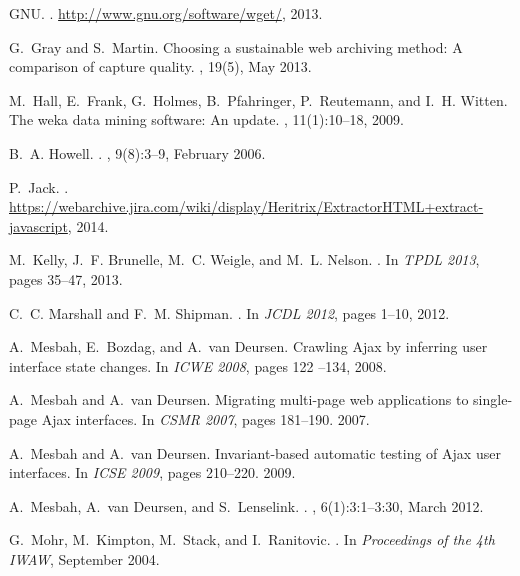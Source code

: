 \documentclass{ipres_proc_article-sp}
\begin{document}
\begin{thebibliography}{10}
{GNU}.
.
\newblock \url{http://www.gnu.org/software/wget/}, 2013.

G.~Gray and S.~Martin.
\newblock Choosing a sustainable web archiving method: A comparison of capture
  quality.
, 19(5), May 2013.

M.~Hall, E.~Frank, G.~Holmes, B.~Pfahringer, P.~Reutemann, and I.~H. Witten.
\newblock The weka data mining software: An update.
, 11(1):10--18, 2009.

B.~A. Howell.
.
, 9(8):3--9, February 2006.

P.~Jack.
.
\newblock
  \url{https://webarchive.jira.com/wiki/display/Heritrix/ExtractorHTML+extract-javascript},
  2014.

M.~Kelly, J.~F. Brunelle, M.~C. Weigle, and M.~L. Nelson.
.
\newblock In {\em {TPDL 2013}}, pages 35--47, 2013.

C.~C. Marshall and F.~M. Shipman.
.
\newblock In {\em {JCDL 2012}}, pages 1--10, 2012.

A.~Mesbah, E.~Bozdag, and A.~van Deursen.
\newblock Crawling {A}jax by inferring user interface state changes.
\newblock In {\em ICWE 2008}, pages 122 --134, 2008.

A.~Mesbah and A.~van Deursen.
\newblock Migrating multi-page web applications to single-page {Ajax} interfaces.
\newblock In {\em CSMR 2007}, pages 181--190. 2007.

A.~Mesbah and A.~van Deursen.
\newblock Invariant-based automatic testing of {A}jax user interfaces.
\newblock In {\em ICSE 2009}, pages 210--220. 2009.

A.~Mesbah, A.~van Deursen, and S.~Lenselink.
.
, 6(1):3:1--3:30, March 2012.

G.~Mohr, M.~Kimpton, M.~Stack, and I.~Ranitovic.
.
\newblock In {\em Proceedings of the 4th IWAW},
  September 2004.


\end{thebibliography}
\end{document}
